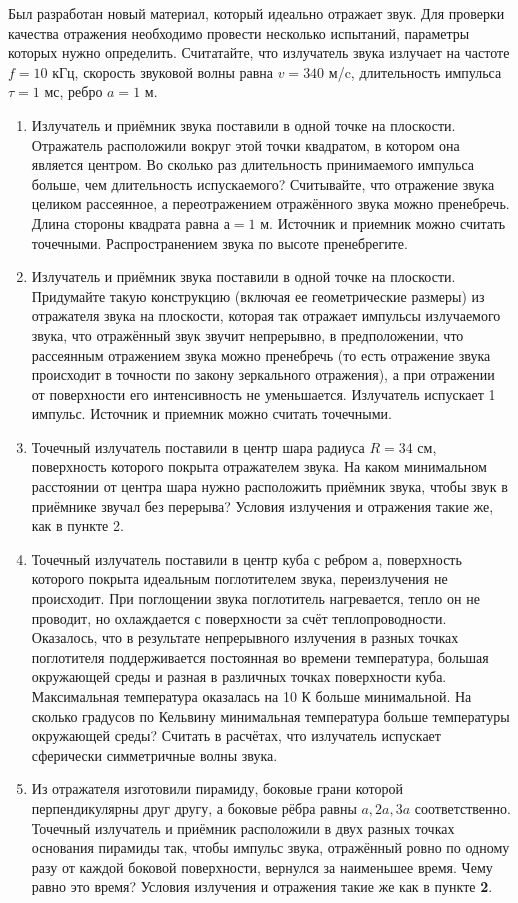 Был разработан новый материал, который идеально отражает звук. Для проверки качества отражения необходимо провести несколько испытаний, параметры которых нужно определить. Считатайте, что излучатель звука излучает на частоте $f = 10$ кГц, скорость звуковой волны равна $v = 340$ м/c, длительность импульса $\tau = 1$ мс, ребро $a = 1$ м.
\begin{enumerate}
\item Излучатель и приёмник звука поставили в одной точке на плоскости.  Отражатель расположили вокруг этой точки квадратом, в котором она является центром. Во сколько раз длительность принимаемого импульса больше, чем длительность испускаемого? Считывайте, что отражение звука целиком рассеянное, $а$ переотражением отражённого звука можно пренебречь. Длина стороны квадрата равна $а = 1$ м. Источник и приемник можно считать точечными. Распространением звука по высоте пренебрегите.
\item Излучатель и приёмник звука поставили в одной точке на плоскости. Придумайте такую конструкцию (включая ее геометрические размеры) из отражателя звука на плоскости, которая так отражает импульсы излучаемого звука, что отражённый звук звучит непрерывно, в предположении, что рассеянным отражением звука можно пренебречь (то есть отражение звука происходит в точности по закону зеркального отражения), а при отражении от поверхности его интенсивность не уменьшается. Излучатель испускает 1 импульс.  Источник и приемник можно считать точечными.
\item Точечный излучатель поставили в центр шара радиуса $R = 34$ см, поверхность которого покрыта отражателем звука. На каком минимальном расстоянии от центра шара нужно расположить приёмник звука, чтобы звук в приёмнике звучал без перерыва? Условия излучения и отражения такие же, как в пункте 2.
\item Точечный излучатель поставили в центр куба с ребром а, поверхность которого покрыта идеальным поглотителем звука, переизлучения не происходит. При поглощении звука поглотитель нагревается, тепло он не проводит, но охлаждается с поверхности за счёт теплопроводности. Оказалось, что в результате непрерывного излучения в разных точках поглотителя поддерживается постоянная во времени температура, большая окружающей среды и разная в различных точках поверхности куба. Максимальная температура оказалась на 10 К больше минимальной.  На сколько градусов по Кельвину минимальная температура больше температуры окружающей среды? Считать в расчётах, что излучатель испускает сферически симметричные волны звука.
\item Из отражателя изготовили пирамиду, боковые грани которой перпендикулярны друг другу, а боковые рёбра равны $a, 2a, 3a$ соответственно. Точечный излучатель и приёмник расположили в двух разных точках основания пирамиды так, чтобы импульс звука, отражённый ровно по одному разу от каждой боковой поверхности, вернулся за наименьшее время. Чему равно это время? Условия излучения и отражения такие же как в пункте \textbf{2}. 

\end{enumerate}
